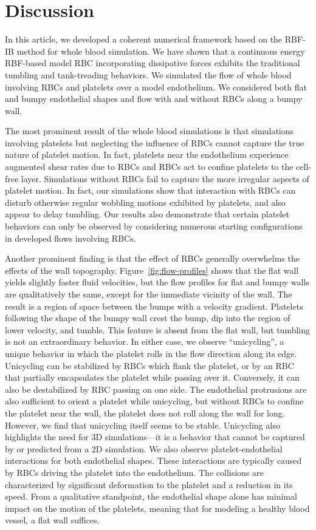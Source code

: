 \section{Discussion}\label{sec:conclusion}

In this article, we developed a coherent numerical framework based on the RBF-IB method
for whole blood simulation. We have shown that a continuous energy RBF-based model RBC
incorporating dissipative forces exhibits the traditional tumbling and tank-treading
behaviors. We simulated the flow of whole blood involving RBCs and platelets over a model
endothelium. We considered both flat and bumpy endothelial shapes and flow with and
without RBCs along a bumpy wall.

The most prominent result of the whole blood simulations is that simulations involving
platelets but neglecting the influence of RBCs cannot capture the true nature of platelet
motion. In fact, platelets near the endothelium experience augmented shear rates due to
RBCs and RBCs act to confine platelets to the cell-free layer. Simulations without RBCs
fail to capture the more irregular aspects of platelet motion. In fact, our simulations
show that interaction with RBCs can disturb otherwise regular wobbling motions exhibited
by platelets, and also appear to delay tumbling. Our results also demonstrate that
certain platelet behaviors can only be observed by considering numerous starting
configurations in developed flows involving RBCs.

Another prominent finding is that the effect of RBCs generally overwhelms the effects of
the wall topography. Figure~\ref{fig:flow-profiles} shows that the flat wall yields
slightly faster fluid velocities, but the flow profiles for flat and bumpy walls are
qualitatively the same, except for the immediate vicinity of the wall. The result is a
region of space between the bumps with a velocity gradient. Platelets following the shape
of the bumpy wall crest the bump, dip into the region of lower velocity, and tumble. This
feature is absent from the flat wall, but tumbling is not an extraordinary behavior. In
either case, we observe ``unicycling'', a unique behavior in which the platelet rolls in
the flow direction along its edge. Unicycling can be stabilized by RBCs which flank the
platelet, or by an RBC that partially encapsulates the platelet while passing over it.
Conversely, it can also be destabilized by RBC passing on one side.  The endothelial
protrusions are also sufficient to orient a platelet while unicycling, but without RBCs
to confine the platelet near the wall, the platelet does not roll along the wall for
long. However, we find that unicycling itself seems to be stable. Unicycling also
highlights the need for 3D simulations---it is a behavior that cannot be captured by or
predicted from a 2D simulation. We also observe platelet-endothelial interactions for
both endothelial shapes. These interactions are typically caused by RBCs driving the
platelet into the endothelium. The collisions are characterized by significant
deformation to the platelet and a reduction in its speed. From a qualitative standpoint,
the endothelial shape alone has minimal impact on the motion of the platelets, meaning
that for modeling a healthy blood vessel, a flat wall suffices.

